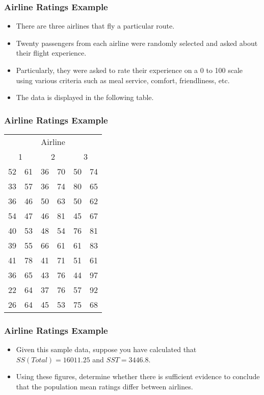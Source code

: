 \documentclass[12pt]{beamer}
\begin{document}
\begin{frame}
	\frametitle{Airline Ratings Example}
	
	\begin{itemize}[label={\color{blue}$\blacktriangleright$}]
		\item There are three airlines that fly a particular route.
		
		\item Twenty passengers from each airline were randomly selected and asked about their flight experience.
		
		\item Particularly, they were asked to rate their experience on a 0 to 100 scale using various criteria such as meal service, comfort, friendliness, etc.
		
		\item The data is displayed in the following table.
	\end{itemize}
	
\end{frame}
\begin{frame}
	\frametitle{Airline Ratings Example}
	
	\begin{table}
		\centering
		\begin{tabular}{cccccc}
			\toprule
			\multicolumn{6}{c}{Airline} \\
			\multicolumn{2}{c}{1} & \multicolumn{2}{c}{2} & \multicolumn{2}{c}{3} \\
			\midrule
			52 & 61 & 36 & 70 & 50 & 74 \\
			33 & 57 & 36 & 74 & 80 & 65 \\
			36 & 46 & 50 & 63 & 50 & 62 \\
			54 & 47 & 46 & 81 & 45 & 67 \\
			40 & 53 & 48 & 54 & 76 & 81 \\
			39 & 55 & 66 & 61 & 61 & 83 \\
			41 & 78 & 41 & 71 & 51 & 61 \\
			36 & 65 & 43 & 76 & 44 & 97 \\
			22 & 64 & 37 & 76 & 57 & 92 \\
			26 & 64 & 45 & 53 & 75 & 68 \\
			\bottomrule
		\end{tabular}
	\end{table}
	
\end{frame}
\begin{frame}
	\frametitle{Airline Ratings Example}
	
	\begin{itemize}[label={\color{blue}$\blacktriangleright$}]
		\item Given this sample data, suppose you have calculated that $SS(Total) = 16011.25$ and $SST = 3446.8$.
		
		\item Using these figures, determine whether there is sufficient evidence to conclude that the population mean ratings differ between airlines.
	\end{itemize}
	
\end{frame}
\end{document}
